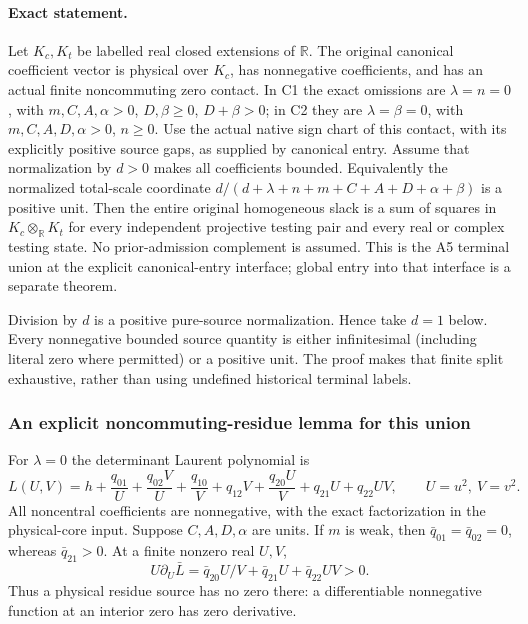 \paragraph{Exact statement.}
Let \(K_c,K_t\) be labelled real closed extensions of \(\mathbb R\).
The original canonical coefficient vector is physical over \(K_c\),
has nonnegative coefficients, and has an actual finite noncommuting
zero contact. In C1 the exact omissions are \(\lambda=n=0\),
with \(m,C,A,\alpha>0\), \(D,\beta\geq0\), \(D+\beta>0\);
in C2 they are \(\lambda=\beta=0\), with
\(m,C,A,D,\alpha>0\), \(n\geq0\).
Use the actual native sign chart of this contact, with its explicitly
positive source gaps, as supplied by canonical entry.
Assume that normalization by \(d>0\) makes all coefficients bounded.
Equivalently the normalized total-scale coordinate
\(d/(d+\lambda+n+m+C+A+D+\alpha+\beta)\) is a positive unit.
Then the entire original homogeneous slack is a sum of squares
in \(K_c\otimes_{\mathbb R}K_t\) for every independent projective
testing pair and every real or complex testing state.
No prior-admission complement is assumed.
This is the A5 terminal union at the explicit canonical-entry interface;
global entry into that interface is a separate theorem.

Division by \(d\) is a positive pure-source normalization.
Hence take \(d=1\) below. Every nonnegative bounded source quantity
is either infinitesimal (including literal zero where permitted)
or a positive unit. The proof makes that finite split exhaustive,
rather than using undefined historical terminal labels.

\subsubsection*{An explicit noncommuting-residue lemma for this union}

For \(\lambda=0\) the determinant Laurent polynomial is
\[
 L(U,V)=h+\frac{q_{01}}U+\frac{q_{02}V}U+\frac{q_{10}}V
       +q_{12}V+\frac{q_{20}U}V+q_{21}U+q_{22}UV ,
 \qquad U=u^2,\ V=v^2.
 \tag{AU1}
\]
All noncentral coefficients are nonnegative, with the exact
factorization in the physical-core input.
Suppose \(C,A,D,\alpha\) are units.
If \(m\) is weak, then \(\bar q_{01}=\bar q_{02}=0\), whereas
\(\bar q_{21}>0\). At a finite nonzero real \(U,V\),
\[
 U\partial_U\bar L
   =\bar q_{20}U/V+\bar q_{21}U+\bar q_{22}UV>0.
 \tag{AU2}
\]
Thus a physical residue source has no zero there:
a differentiable nonnegative function at an interior zero
has zero derivative.

